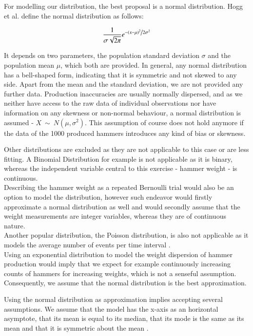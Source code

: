 For modelling our distribution, the best proposal is a normal distribution. Hogg et al. \cite[Definition~3.4.1]{hogg} define the normal distribution as follows: 

\begin{equation} \frac{1}{{\sigma \sqrt {2\pi } }}e^{{{ - \left( {x - \mu } \right)^2 } \mathord{\left/ {\vphantom {{ - \left( {x - \mu } \right)^2 } {2\sigma ^2 }}} \right. \kern-\nulldelimiterspace}{2\sigma ^2 }}}
\label{eq:normaldist}
\end{equation}


It depends on two parameters, the population standard deviation $\sigma$ and the population mean $\mu$, which both are provided. In general, any normal distribution has a bell-shaped form, indicating that it is symmetric and not skewed to any side. Apart from the mean and the standard deviation, we are not provided any further data. Production inaccuracies are usually normally dispersed, and as we neither have access to the raw data of individual observations nor have information on any skewness or non-normal behaviour, a normal distribution is assumed - $ X~\sim~N(\mu, \sigma^2)$. This assumption of course does not hold anymore if the data of the 1000 produced hammers introduces any kind of bias or skewness. 


Other distributions are excluded as they are not applicable to this case or are less fitting. A Binomial Distribution for example is not applicable as it is binary, whereas the independent variable central to this exercise - hammer weight - is continuous. \\Describing the hammer weight as a repeated Bernoulli trial would also be an option to model the distribution, however such endeavor would firstly approximate a normal distribution as well and would secondly assume that the weight measurements are integer variables, whereas they are of continuous nature. \\
Another popular distribution, the Poisson distribution, is also not applicable as it models the average number of events per time interval \cite{bruce2017practical}. \\
Using an exponential distribution to model the weight dispersion of hammer production would imply that we expect for example continuously increasing counts of hammers for increasing weights, which is not a senseful assumption. \\
Consequently, we assume that the normal distribution is the best approximation.

Using the normal distribution as approximation implies accepting several assumptions. We assume that the model has the x-axis as an horizontal asymptote, that its mean is equal to its median, that its mode is the same as its mean and that it is symmetric about the mean \cite[Chapter~3.4]{hogg}.

